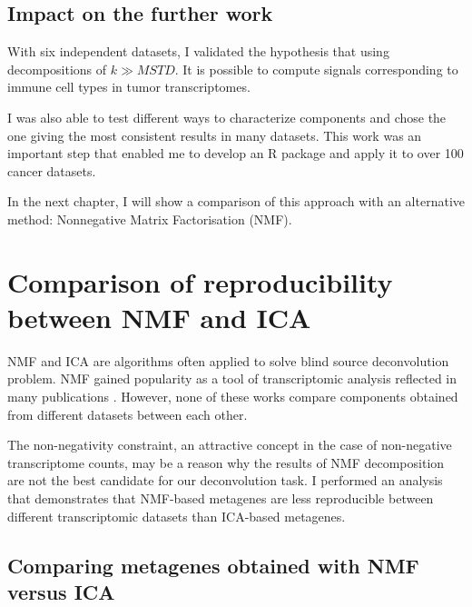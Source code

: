 \documentclass[12pt,]{book}
\theoremstyle{definition}
\theoremstyle{definition}
\theoremstyle{definition}
\theoremstyle{remark}
\begin{document}
\hypertarget{impact-on-the-further-work-1}{%
\section{Impact on the further
work}\label{impact-on-the-further-work-1}}

With six independent datasets, I validated the hypothesis that using
decompositions of \(k \gg MSTD\). It is possible to compute signals
corresponding to immune cell types in tumor transcriptomes.

I was also able to test different ways to characterize components and
chose the one giving the most consistent results in many datasets. This
work was an important step that enabled me to develop an R package and
apply it to over 100 cancer datasets.

In the next chapter, I will show a comparison of this approach with an
alternative method: Nonnegative Matrix Factorisation (NMF).



\hypertarget{nmfica}{%
\chapter{Comparison of reproducibility between NMF and
ICA}\label{nmfica}}


NMF and ICA are algorithms often applied to solve blind source
deconvolution problem. NMF gained popularity as a tool of transcriptomic
analysis reflected in many publications
\citep{Moffitt2015, Shen-Orr2013, Brunet2004, Repsilber2010}. However,
none of these works compare components obtained from different datasets
between each other.

The non-negativity constraint, an attractive concept in the case of
non-negative transcriptome counts, may be a reason why the results of
NMF decomposition are not the best candidate for our deconvolution task.
I performed an analysis that demonstrates that NMF-based metagenes are
less reproducible between different transcriptomic datasets than
ICA-based metagenes.

\hypertarget{comparing-metagenes-obtained-with-nmf-versus-ica}{%
\section{Comparing metagenes obtained with NMF versus
ICA}\label{comparing-metagenes-obtained-with-nmf-versus-ica}}
\end{document}
